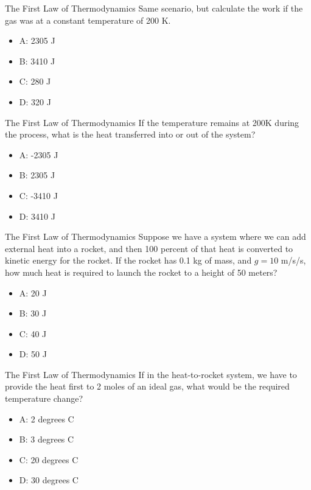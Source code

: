 \documentclass{beamer}
\begin{document}
\begin{frame}{The First Law of Thermodynamics}
Same scenario, but calculate the work if the gas was at a constant temperature of 200 K.
\begin{itemize}
\item A: 2305 J
\item B: 3410 J
\item C: 280 J
\item D: 320 J
\end{itemize} 
\end{frame}

\begin{frame}{The First Law of Thermodynamics}
If the temperature remains at 200K during the process, what is the heat transferred into or out of the system?
\begin{itemize}
\item A: -2305 J
\item B: 2305 J
\item C: -3410 J
\item D: 3410 J
\end{itemize} 
\end{frame}

\begin{frame}{The First Law of Thermodynamics}
Suppose we have a system where we can add external heat into a rocket, and then 100 percent of that heat is converted to kinetic energy for the rocket.  If the rocket has 0.1 kg of mass, and $g = 10$ m/s/s, how much heat is required to launch the rocket to a height of 50 meters?
\begin{itemize}
\item A: 20 J
\item B: 30 J
\item C: 40 J
\item D: 50 J
\end{itemize} 
\end{frame}

\begin{frame}{The First Law of Thermodynamics}
If in the heat-to-rocket system, we have to provide the heat first to 2 moles of an ideal gas, what would be the required temperature change?
\begin{itemize}
\item A: 2 degrees C
\item B: 3 degrees C
\item C: 20 degrees C
\item D: 30 degrees C
\end{itemize} 
\end{frame}
\end{document}
